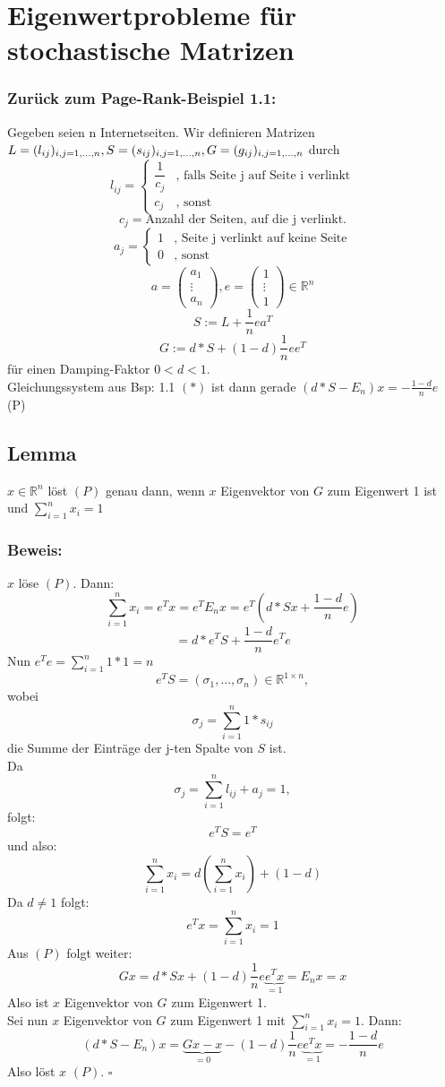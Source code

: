 \documentclass{scrbook}
\begin{document}
\chapter{Eigenwertprobleme für stochastische Matrizen}
\subsection*{Zurück zum Page-Rank-Beispiel 1.1:}
Gegeben seien n Internetseiten. Wir definieren Matrizen $L=(l_{ij})_{i,j=1,...,n},S=(s_{ij})_{i,j=1,...,n},\\G=(g_{ij})_{i,j=1,...,n}$ durch
\[l_{ij}=\left\{
\begin{array}{ll}
\dfrac{1}{c_j} &\text{, falls Seite j auf Seite i verlinkt}\\
c_j&\text{, sonst}
\end{array}\right.
\]\[
c_j = \text{Anzahl der Seiten, auf die j verlinkt.}
\]
\[a_j = \left\{
\begin{array}{ll}
1&\text{, Seite j verlinkt auf keine Seite}\\
0&\text{, sonst}
\end{array}
\right.\]
\[a=\left(\begin{array}{c}
a_1\\\vdots \\ a_n
\end{array}\right), e=\left(
\begin{array}{c}
1\\\vdots\\1
\end{array}
\right)\in \mathbb{R}^n\]
\[S:= L+\frac{1}{n}ea^T\]
\[G:= d*S+(1-d)\frac{1}{n}ee^T\]
für einen Damping-Faktor $0<d<1$.\\
Gleichungssystem aus Bsp: 1.1 $(*)$ ist dann gerade $(d*S -E_n) x = -\frac{1-d}{n}e$ (P)
\section{Lemma}
$x \in \mathbb{R}^n$ löst $(P)$ genau dann, wenn $x$ Eigenvektor von $G$ zum Eigenwert 1 ist und $\sum^n_{i=1}x_i=1$
\subsection*{Beweis:}
$x$ löse $(P)$. Dann:\[\sum^n_{i=1} x_i = e^Tx = e^T E_n x = e^T(d*S x+ \frac{1-d}{n}e)\]
\[=d*e^TS+\frac{1-d}{n}e^Te\]
Nun $e^Te = \sum^n_{i=1}1*1 = n$
\[e^TS = (\sigma_1,...,\sigma_n)\in \mathbb{R}^{1\times n},\] wobei \[\sigma_j = \sum^n_{i=1}1*s_{ij}\] die Summe der Einträge der j-ten Spalte von $S$ ist.\\Da
\[\sigma_j = \sum^n_{i=1} l_{ij}+a_j = 1,\] folgt: \[e^TS=e^T\] und also: \[\sum^n_{i=1}x_i = d(\sum^n_{i=1}x_i) + (1-d)\] Da $d \neq 1$ folgt:\[e^Tx = \sum^n_{i=1}x_i = 1\]
Aus $(P)$ folgt weiter:
\[Gx = d*Sx +(1-d) \frac{1}{n} e\underbrace{ e^Tx}_{=1} = E_n x = x\]
Also ist $x$ Eigenvektor von $G$ zum Eigenwert 1.\\
Sei nun $x$ Eigenvektor von $G$ zum Eigenwert 1 mit $\sum^n_{i=1}x_i = 1$. Dann:
\[(d*S-E_n)x =\underbrace{ Gx -x}_{=0} -(1-d) \frac{1}{n} e\underbrace{e^Tx}_{=1} = -\frac{1-d}{n}e\] Also löst $x$ $(P)$. $\square$
\end{document}
